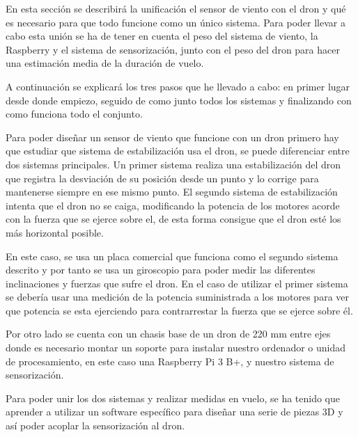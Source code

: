 
En esta sección se describirá la unificación el sensor de viento con el dron y qué es necesario para que todo funcione como un único sistema.
Para poder llevar a cabo esta unión se ha de tener en cuenta el peso del sistema de viento, la Raspberry y el sistema de sensorización, junto con el peso del dron para hacer una estimación media de la duración de vuelo.

A continuación se explicará los tres pasos que he llevado a cabo: en primer lugar desde donde empiezo, seguido de como junto todos los sistemas y finalizando con como funciona todo el conjunto.

Para poder diseñar un sensor de viento que funcione con un dron primero hay que estudiar que sistema de estabilización usa el dron, se puede diferenciar entre dos sistemas principales. Un primer sistema realiza una estabilización del dron que registra la desviación de su posición desde un punto y lo corrige para mantenerse siempre en ese mismo punto. El segundo sistema de estabilización intenta que el dron no se caiga, modificando la potencia de los motores acorde con la fuerza que se ejerce sobre el, de esta forma consigue que el dron esté los más horizontal posible.

En este caso, se usa un placa comercial que funciona como el segundo sistema descrito y por tanto se usa un giroscopio para poder medir las diferentes inclinaciones y fuerzas que sufre el dron. En el caso de utilizar el primer sistema se debería usar una medición de la potencia suministrada a los motores para ver que potencia se esta ejerciendo para contrarrestar la fuerza que se ejerce sobre él.

Por otro lado se cuenta con un chasis base de un dron de 220 mm entre ejes donde es necesario montar un soporte para instalar nuestro ordenador o unidad de procesamiento, en este caso una Raspberry Pi 3 B+, y nuestro sistema de sensorización.

Para poder unir los dos sistemas y realizar medidas en vuelo, se ha tenido que aprender a utilizar un software específico para diseñar una serie de piezas 3D y así poder acoplar la sensorización al dron.

